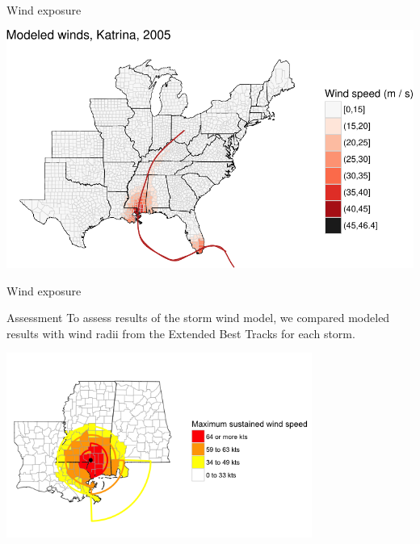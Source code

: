 \documentclass[ignorenonframetext,]{beamer}
\begin{document}
\begin{frame}{Wind exposure}

\begin{center}\includegraphics[width=\textwidth]{anderson_jan18_files/figure-beamer/unnamed-chunk-5-1} \end{center}

\end{frame}

\begin{frame}{Wind exposure}

\begin{block}{Assessment}
To assess results of the storm wind model, we compared modeled results with wind radii from the Extended Best Tracks for each storm. 
\end{block}

\vspace{-0.5cm}

\begin{center}\includegraphics[width=0.75\textwidth]{ext_tracks_2} \end{center}

\end{frame}
\end{document}
